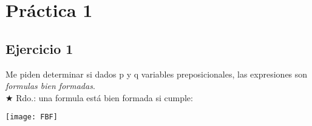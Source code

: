 
\usepackage{caratula}
\usepackage{enumerate}
\usepackage{hyperref}
\usepackage{graphicx}
\usepackage{amsfonts}
\usepackage{enumitem}

\decimalpoint
\hypersetup{colorlinks=true, linkcolor=black, urlcolor=blue}
\setlength{\parindent}{0em}
\setlength{\parskip}{0.5em}
\setcounter{tocdepth}{2} %
\setcounter{section}{0} %
\renewcommand{\thesubsubsection}{\thesubsection.\Alph{subsubsection}}
\graphicspath{ {images/} }





\maketitle
\newpage

\tableofcontents
\newpage

\section{Práctica 1}

\subsection{Ejercicio 1}

Me piden determinar si dados p y q variables preposicionales, las expresiones son \emph{formulas bien formadas}.\\
$\bigstar$ Rdo.: una formula está bien formada si cumple: 

\texttt{[image: FBF]}

